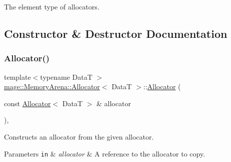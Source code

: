The element type of allocators. 

\subsection{Constructor \& Destructor Documentation}
\hypertarget{structmage_1_1_memory_arena_1_1_allocator_ac7d640d69207604612c29ebc60ec6648}{}\label{structmage_1_1_memory_arena_1_1_allocator_ac7d640d69207604612c29ebc60ec6648} 
\subsubsection{\texorpdfstring{Allocator()}{Allocator()}\hspace{0.1cm}{\footnotesize\ttfamily [1/4]}}
{\footnotesize\ttfamily template$<$typename DataT $>$ \\
\hyperlink{structmage_1_1_memory_arena_1_1_allocator}{mage\+::\+Memory\+Arena\+::\+Allocator}$<$ DataT $>$\+::\hyperlink{structmage_1_1_memory_arena_1_1_allocator}{Allocator} (\begin{DoxyParamCaption}\item[{const \hyperlink{structmage_1_1_memory_arena_1_1_allocator}{Allocator}$<$ DataT $>$ \&}]{allocator }\end{DoxyParamCaption})\hspace{0.3cm}{\ttfamily [default]}, {\ttfamily [noexcept]}}

Constructs an allocator from the given allocator.


\begin{DoxyParams}[1]{Parameters}
\mbox{\tt in}  & {\em allocator} & A reference to the allocator to copy. \\
\hline
\end{DoxyParams}
\hypertarget{structmage_1_1_memory_arena_1_1_allocator_a54ddc035b0987d71776c54a1240be18d}{}\label{structmage_1_1_memory_arena_1_1_allocator_a54ddc035b0987d71776c54a1240be18d} 
